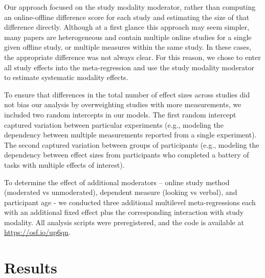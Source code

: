 \documentclass[
  man,floatsintext]{apa6}
\begin{document}
Our approach focused on the study modality moderator, rather than computing an online-offline difference score for each study and estimating the size of that difference directly. Although at a first glance this approach may seem simpler, many papers are heterogeneous and contain multiple online studies for a single given offline study, or multiple measures within the same study. In these cases, the appropriate difference was not always clear. For this reason, we chose to enter all study effects into the meta-regression and use the study modality moderator to estimate systematic modality effects.

To ensure that differences in the total number of effect sizes across studies did not bias our analysis by overweighting studies with more measurements, we included two random intercepts in our models. The first random intercept captured variation between particular experiments (e.g., modeling the dependency between multiple measurements reported from a single experiment). The second captured variation between groups of participants (e.g., modeling the dependency between effect sizes from participants who completed a battery of tasks with multiple effects of interest).

To determine the effect of additional moderators -- online study method (moderated vs unmoderated), dependent measure (looking vs verbal), and participant age - we conducted three additional multilevel meta-regressions each with an additional fixed effect plus the corresponding interaction with study modality. All analysis scripts were preregistered, and the code is available at \href{}{https://osf.io/up6qn}.

\hypertarget{results}{%
\section{Results}\label{results}}
\end{document}
